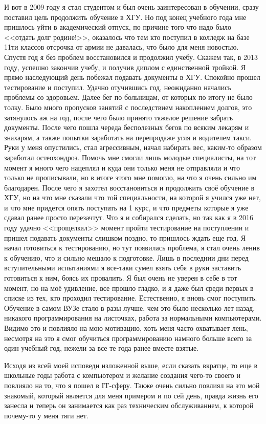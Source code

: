 И вот в 2009 году я стал студентом и был очень заинтересован в обучении, сразу поставил цель продолжить обучение в ХГУ. Но под конец учебного года мне пришлось уйти в академический отпуск, по причине того что надо было <<отдать долг родине!>>, оказалось что тем кто поступил в колледж на базе 11ти классов отсрочка от армии не давалась, что было для меня новостью. Спустя год я без проблем восстановился и продолжил учебу. Скажем так, в 2013 году, успешно закончив учебу, и получив диплом с единственной тройкой. Я прямо наследующий день побежал подавать документы в ХГУ. Спокойно прошел тестирование и поступил. Удачно отучившись год, неожиданно начались проблемы со здоровьем. Далее бег по больницам, от которых по итогу не было толку. Было много пропусков занятий с последствием накоплением долгов, это затянулось аж на год, после чего было принято тяжелое решение забрать документы. После чего пошла череда бесполезных бегов по всяким лекарям и знахарям, а также попытки заработать на перепродаже угля и водителем такси. Руки у меня опустились, стал агрессивным, начал набирать вес, каким-то образом заработал остеохондроз. Помочь мне смогли лишь молодые специалисты, на тот момент я много чего нацеплял и куда они только меня не отправляли и что только не прописывали, но в итоге этого мне помогло, на что я очень сильно им благодарен. После чего я захотел восстановиться и продолжить своё обучение в ХГУ, но на что мне сказали что той специальности, на которой я учился уже нет, и что мне придется опять поступать на 1 курс, и что предметы которые я уже сдавал ранее просто перезачтут. Что я и собирался сделать, но так как  я в 2016 году удачно <<прощелкал>> момент пройти тестирование на поступлении и пришел подавать документы слишком поздно, то пришлось ждать еще год. Я начал готовиться к тестированию, но тут появилась проблема, я стал очень ленив к обучению, что и сильно мешало к подготовке. Лишь в последнии дни перед вступительными испытаниями я все-таки сумел взять себя в руки заставить готовиться к ним, боясь их провалить. Я был очень не уверен в себе в тот момент, но на моё удивление, все прошло гладко, и я даже был среди первых в списке из тех, кто проходил тестирование. Естественно, я вновь смог поступить. Обучение в самом ВУЗе стало в разы лучше, чем это было несколько лет назад, никакого программирования на листочках, работа за нормальными компьютерами. Видимо это и повлияло на мою мотивацию, хоть меня часто охватывает лень, несмотря на это я смог обучиться программированию намного больше всего за один учебный год, нежели за все те года ранее вместе взятые.

Исходя из всей моей исповеди изложенной выше, если сказать вкратце, то еще в школьные годы работа с компьютером и желание создания чего-то своего и повлияло на то, что я пошел в IT-сферу. Также очень сильно повлиял на это мой знакомый, который является для меня примером и по сей день, правда жизнь его занесла и теперь он занимается как раз техническим обслуживанием, к которой почему-то у меня тяги нет.